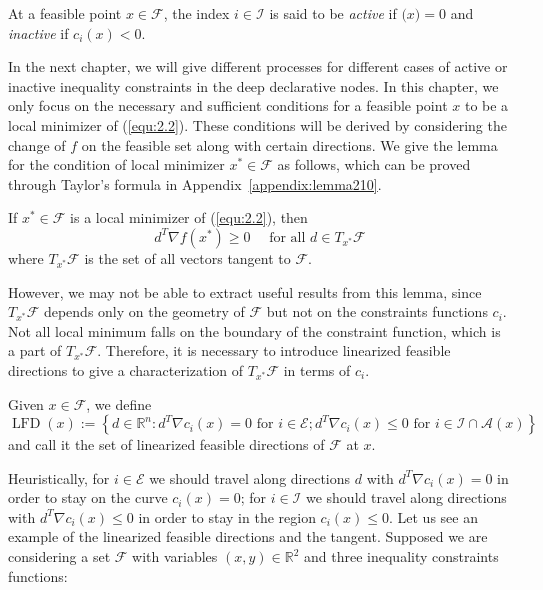 \begin{defn}
    At a feasible point $x \in \mathscr{F}$, the index $i \in \mathscr{I}$ is said to be \emph{active} if $\mathscr(x) = 0$ and \emph{inactive} if $c_i(x) < 0$.  
\end{defn}
\par In the next chapter, we will give different processes for different cases of active or inactive inequality constraints in the deep declarative nodes. In this chapter, we only focus on the necessary and sufficient conditions for a feasible point $x$ to be a local minimizer of (\ref{equ:2.2}). These conditions will be derived by considering the change of $f$ on the feasible set along with certain directions. We give the lemma for the condition of local minimizer $x^* \in \mathscr{F}$ as follows, which can be proved through Taylor’s formula in Appendix~\ref{appendix:lemma210}.
\begin{lemma}
    \label{lemma:210}
    If $x^* \in \mathscr{F}$ is a local minimizer of (\ref{equ:2.2}), then
    $$
    d^{T} \nabla f\left(x^{*}\right) \geq 0 \quad \textrm { for all } d \in T_{x^{*}} \mathscr{F}
    $$
    where $T_{x^{*}} \mathscr{F}$ is the set of all vectors tangent to $\mathscr{F}$. 
\end{lemma}
\par However, we may not be able to extract useful results from this lemma, since $T_{x^{*}} \mathscr{F}$ depends only on the geometry of $\mathscr{F}$ but not on the constraints functions $c_i$. Not all local minimum falls on the boundary of the constraint function, which is a part of $T_{x^{*}} \mathscr{F}$. Therefore, it is necessary to introduce linearized feasible directions to give a characterization of $T_{x^{*}} \mathscr{F}$ in terms of $c_i$. 
\begin{defn}
    Given $x \in \mathscr{F}$, we define
    $$
    \operatorname{LFD}(x):=\left\{d \in \mathbb{R}^{n}: d^{T} \nabla c_{i}(x)=0 \text { for } i \in \mathscr{E} ; d^{T} \nabla c_{i}(x) \leq 0 \textrm { for } i \in \mathscr{I} \cap \mathscr{A}(x)\right\}
    $$
    and call it the set of linearized feasible directions of $\mathscr{F}$ at $x$. 
\end{defn}
\par Heuristically, for $i \in \mathscr{E}$ we should travel along directions $d$ with $d^{T} \nabla c_{i}(x)=0$ in order to stay on the curve $c_i(x)=0$; for $i \in \mathscr{I}$ we should travel along directions with $d^{T} \nabla c_{i}(x) \leq 0$ in order to stay in the region $c_i(x) \leq 0$. 
Let us see an example of the linearized feasible directions and the tangent. Supposed we are considering a set $\mathscr{F}$ with variables $(x,y) \in \mathbb{R}^2$ and three inequality constraints functions: 
